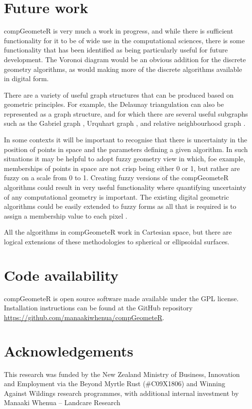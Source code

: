 \documentclass[12pt, a4paper]{article}
\begin{document}
\section{Future work}

compGeometeR is very much a work in progress, and while there is sufficient functionality for it to be of wide use in the computational sciences, there is some functionality that has been identified as being particularly useful for future development.  The Voronoi diagram would be an obvious addition for the discrete geometry algorithms, as would making more of the discrete algorithms available in digital form.

There are a variety of useful graph structures that can be produced based on geometric principles.  For example, the Delaunay triangulation \citep{delaunay-1934} can also be represented as a graph structure, and for which there are several useful subgraphs such as the Gabriel graph \citep{gabriel-1969}, Urquhart graph \citep{urquhart-1980}, and relative neighbourhood graph \citep{toussaint-1980}.

In some contexts it will be important to recognise that there is uncertainty in the position of points in space and the parameters defining a given algorithm.  In such situations it may be helpful to adopt fuzzy geometry \citep{rosenfeld-1998} view in which, foe example, memberships of points in space are not crisp being either 0 or 1, but rather are fuzzy on a scale from 0 to 1.  Creating fuzzy versions of the compGeometeR algorithms could result in very useful functionality where quantifying uncertainty of any computational geometry is important.  The existing digital geometric algorithms could be easily extended to fuzzy forms as all that is required is to assign a membership value to each pixel \citep{klette-2004}.

All the algorithms in compGeometeR work in Cartesian space, but there are logical extensions of these methodologies to spherical or ellipsoidal surfaces.

\section{Code availability}

compGeometeR is open source software made available under the GPL license. Installation
instructions can be found at the GitHub repository \url{https://github.com/manaakiwhenua/compGeometeR}.

\section{Acknowledgements}

This research was funded by the New Zealand Ministry of Business, Innovation and Employment via the Beyond Myrtle Rust (\#C09X1806) and Winning Against Wildings research programmes, with additional internal investment by Manaaki Whenua -- Landcare Research



\end{document}
